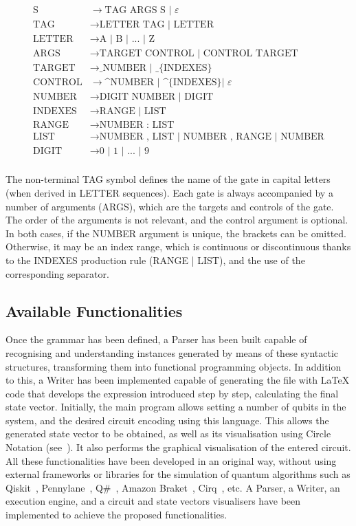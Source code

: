 \documentclass[sigconf,natbib=false]{acmart}
\begin{document}
	\begin{align*}
		\text{S} &\rightarrow \text{TAG ARGS S | } \varepsilon \\
		\text{TAG} &\rightarrow \text{LETTER TAG | LETTER} \\
		\text{LETTER} &\rightarrow \text{A | B | ... | Z} \\
		\text{ARGS} &\rightarrow \text{TARGET CONTROL | CONTROL TARGET} \\
		\text{TARGET} &\rightarrow \text{\_NUMBER | \_\{INDEXES\}} \\
		\text{CONTROL} &\rightarrow \text{\textasciicircum NUMBER | \textasciicircum \{INDEXES\} | } \varepsilon \\
		\text{NUMBER} &\rightarrow \text{DIGIT NUMBER | DIGIT} \\
		\text{INDEXES} &\rightarrow \text{RANGE | LIST} \\
		\text{RANGE} &\rightarrow \text{NUMBER : LIST} \\
		\text{LIST} &\rightarrow \text{NUMBER , LIST | NUMBER , RANGE | NUMBER} \\
		\text{DIGIT} &\rightarrow \text{0 | 1 | ... | 9} \\
	\end{align*}

    The non-terminal TAG symbol defines the name of the gate in capital letters (when derived in LETTER sequences). Each gate is always accompanied by a number of arguments (ARGS), which are the targets and controls of the gate. The order of the arguments is not relevant, and the control argument is optional. In both cases, if the NUMBER argument is unique, the brackets can be omitted. Otherwise, it may be an index range, which is continuous or discontinuous thanks to the INDEXES production rule (RANGE | LIST), and the use of the corresponding separator.

    \subsection{Available Functionalities}
    Once the grammar has been defined, a Parser has been built capable of recognising and understanding instances generated by means of these syntactic structures, transforming them into functional programming objects. In addition to this, a Writer has been implemented capable of generating the file with \LaTeX{} code that develops the expression introduced step by step, calculating the final state vector. Initially, the main program allows setting a number of qubits in the system, and the desired circuit encoding using this language. This allows the generated state vector to be obtained, as well as its visualisation using Circle Notation (see~\cite{Gimeno-Segovia_Harrigan_Johnston_2019}). It also performs the graphical visualisation of the entered circuit. All these functionalities have been developed in an original way, without using external frameworks or libraries for the simulation of quantum algorithms such as Qiskit~\cite{Qiskit}, Pennylane~\cite{Pennylane}, Q\#~\cite{QSharp}, Amazon Braket~\cite{Braket}, Cirq~\cite{Cirq}, etc. A Parser, a Writer, an execution engine, and a circuit and state vectors visualisers have been implemented to achieve the proposed functionalities.
    
\end{document}
